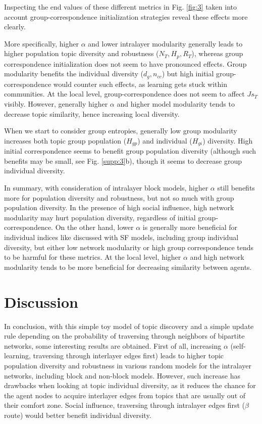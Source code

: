 \documentclass{svproc}
\begin{document}
Inspecting the end values of these different metrics in Fig. \ref{fig:3} taken into account group-correspondence initialization strategies reveal these effects more clearly.

More specifically, higher $\alpha$ and lower intralayer modularity generally leads to higher population topic diversity and robustness ($N_T, H_p, R_T$), whereas group correspondence initialization does not seem to have pronounced effects.
Group modularity benefits the individual diversity ($d_g, n_{cc}$) but high initial group-correspondence would counter such effects, as learning gets stuck within communities.
At the local level, group-correspondence does not seem to affect $Js_T$ visibly.
However, generally higher $\alpha$ and higher model modularity tends to decrease topic similarity, hence increasing local diversity.

When we start to consider group entropies, generally low group modularity increases both topic group population ($H_{gp}$) and individual ($H_{gi}$) diversity.
High initial correspondence seems to benefit group population diversity (although such benefits may be small, see Fig. \ref{supp:3}b), though it seems to decrease group individual diversity.

In summary, with consideration of intralayer block models, higher $\alpha$ still benefits more for population diversity and robustness, but not so much with group population diversity.
In the presence of high social influence, high network modularity may hurt population diversity, regardless of initial group-correspondence.
On the other hand, lower $\alpha$ is generally more beneficial for individual indices like discussed with SF models, including group individual diversity, but either low network modularity or high group correspondence tends to be harmful for these metrics.
At the local level, higher $\alpha$ and high network modularity tends to be more beneficial for decreasing similarity between agents.

\section{Discussion}

In conclusion, with this simple toy model of topic discovery and a simple update rule depending on the probability of traversing through neighbors of bipartite networks, some interesting results are obtained.
First of all, increasing $\alpha$ (self-learning, traversing through interlayer edges first) leads to higher topic population diversity and robustness in various random models for the intralayer networks, including block and non-block models.
However, such increase has drawbacks when looking at topic individual diversity, as it reduces the chance for the agent nodes to acquire interlayer edges from topics that are usually out of their comfort zone.
Social influence, traversing through intralayer edges first ($\beta$ route) would better benefit individual diversity.
\end{document}
